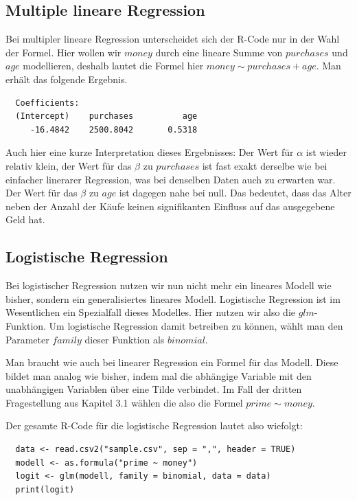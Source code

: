 \subsection{Multiple lineare Regression}

Bei multipler lineare Regression unterscheidet sich der R-Code nur in der Wahl der Formel. Hier wollen wir $money$ durch eine lineare Summe von $purchases$ und $age$ modellieren, deshalb lautet die Formel hier $money \sim purchases + age$. Man erhält das folgende Ergebnis.

\begin{verbatim}
  Coefficients:
  (Intercept)    purchases          age
     -16.4842    2500.8042       0.5318
\end{verbatim}

Auch hier eine kurze Interpretation dieses Ergebnisses: Der Wert für $\alpha$ ist wieder relativ klein, der Wert für das $\beta$ zu $purchases$ ist fast exakt derselbe wie bei einfacher linerarer Regression, was bei denselben Daten auch zu erwarten war. Der Wert für das $\beta$ zu $age$ ist dagegen nahe bei null. Das bedeutet, dass das Alter neben der Anzahl der Käufe keinen signifikanten Einfluss auf das ausgegebene Geld hat.

\subsection{Logistische Regression}

Bei logistischer Regression nutzen wir nun nicht mehr ein lineares Modell wie bisher, sondern ein generalisiertes lineares Modell. Logistische Regression ist im Wesentlichen ein Spezialfall dieses Modelles. Hier nutzen wir also die $glm$-Funktion. Um logistische Regression damit betreiben zu können, wählt man den Parameter $family$ dieser Funktion als $binomial$.

Man braucht wie auch bei linearer Regression ein Formel für das Modell. Diese bildet man analog wie bisher, indem mal die abhängige Variable mit den unabhängigen Variablen über eine Tilde verbindet. Im Fall der dritten Fragestellung aus Kapitel 3.1 wählen die also die Formel $prime \sim money$.

Der gesamte R-Code für die logistische Regression lautet also wiefolgt:

\begin{verbatim}
  data <- read.csv2("sample.csv", sep = ",", header = TRUE)
  modell <- as.formula("prime ~ money")
  logit <- glm(modell, family = binomial, data = data)
  print(logit)
\end{verbatim}

